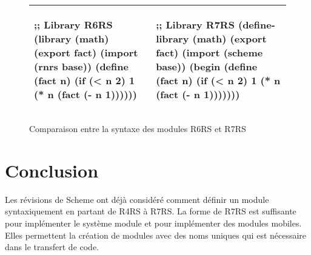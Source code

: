 
\begin{center}
  \begin{figure}[h]
  \begin{tabular}{|l|l|}
    \hline
    \begin{mplisting}{0.5}
;; Library R6RS
(library (math)
  (export fact)
  (import (rnrs base))
  (define (fact n)
    (if (< n 2)
      1
      (* n (fact (- n 1))))))
\end{mplisting} &
    \begin{mplisting}{0.5}
;; Library R7RS
(define-library (math)
  (export fact)
  (import (scheme base))
  (begin
    (define (fact n)
      (if (< n 2)
        1
        (* n (fact (- n 1)))))))
\end{mplisting}\\\hline
  \end{tabular}
    \caption{Comparaison entre la syntaxe des modules R6RS et R7RS}
  \label{fig:r6rs_r7rs_math_mdoule}
\end{figure}
\end{center}


\section{Conclusion}
Les révisions de Scheme ont déjà considéré comment définir un module
syntaxiquement en partant de R4RS à R7RS. La forme 
de R7RS est suffisante pour implémenter le système module et pour implémenter
des modules mobiles. Elles permettent la création de modules avec des noms
uniques qui est nécessaire dans le transfert de code.

